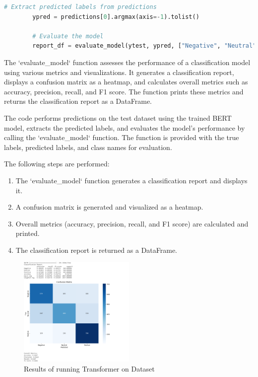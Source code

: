 \documentclass{solutionclass} %
\begin{document}
\begin{solution}
\begin{lstlisting}[language=Python, basicstyle=\ttfamily\footnotesize, keywordstyle=\color{blue}, commentstyle=\color{gray}]
        # Extract predicted labels from predictions
        ypred = predictions[0].argmax(axis=-1).tolist()
        
        # Evaluate the model
        report_df = evaluate_model(ytest, ypred, ["Negative", "Neutral", "Positive"])
        \end{lstlisting}
        
        The `evaluate\_model` function assesses the performance of a classification model using various metrics and visualizations. It generates a classification report, displays a confusion matrix as a heatmap, and calculates overall metrics such as accuracy, precision, recall, and F1 score. The function prints these metrics and returns the classification report as a DataFrame.
        
        The code performs predictions on the test dataset using the trained BERT model, extracts the predicted labels, and evaluates the model's performance by calling the `evaluate\_model` function. The function is provided with the true labels, predicted labels, and class names for evaluation.
        
        The following steps are performed:
        \begin{enumerate}
        \item The `evaluate\_model` function generates a classification report and displays it.
        \item A confusion matrix is generated and visualized as a heatmap.
        \item Overall metrics (accuracy, precision, recall, and F1 score) are calculated and printed.
        \item The classification report is returned as a DataFrame.
                \end{enumerate}
\end{solution}


\begin{figure}[h!]
    \caption{Results of running Transformer on Dataset}
    \centering
    \includegraphics[width=0.5\textwidth]{img/transformer1.png}
\end{figure}
\end{document}
